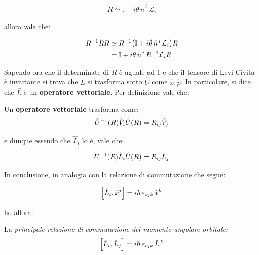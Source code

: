 \begin{itemize}
\begin{myprf}
	\begin{align*}
		\tilde{R} \simeq \mathbb{I} + i \tilde{\theta} \, \tilde{n}^{ \, i} \, \mathcal{L}_i
	\end{align*}
	
		allora vale che:
	
	\begin{align*}
		R^{-1}\tilde{R}R & \simeq R^{-1}\qty(\mathbb{I} + i \tilde{\theta} \, \tilde{n}^{ \, i} \, \mathcal{L}_i)R \\
		& = \mathbb{I} + i \tilde{\theta} \, \tilde{n}^{ \, i} \, R^{-1}\mathcal{L}_iR
	\end{align*}

	\end{myprf}

\end{itemize}

	Sapendo ora che il determinate di $R$ è uguale ad $1$ e che il tensore di Levi-Civita è invariante si trova che $\hat{L}$ si trasforma sotto $\hat{U}$ come $\hat{x}, \hat{p}$. In particolare, si dice che $\hat{L}$ è un \textbf{operatore vettoriale}. Per definizione vale che:
	
\begin{mydef}
	Un \textbf{operatore vettoriale} trasforma come:
\begin{align*}
	\hat{U}^{-1}\qty(R)\hat{V}_i\hat{U}\qty(R) = R_{ij}\hat{V}_j
\end{align*}
\end{mydef}
	
	e dunque essendo che $\hat{L}_i$ lo è, vale che:
	
\begin{align*}
	\hat{U}^{-1}\qty(R)\hat{L}_i\hat{U}\qty(R) = R_{ij}\hat{L}_j
\end{align*}

	In conclusione, in analogia con la relazione di commutazione che segue:

\begin{align*}
	\qty[\hat{L}_i, \hat{x}^j] = i \hbar \, \varepsilon_{ijk} \, \hat{x}^{k}
\end{align*}
	
	ho allora:
	
\begin{mydef}
	La \textit{principale relazione di commutazione del momento angolare orbitale:}
\begin{align*}
	\qty[\hat{L}_i, \hat{L}_j] = i\hbar \, \varepsilon_{ijk} \, \hat{L}^{\, k}
\end{align*}
\end{mydef}
	
